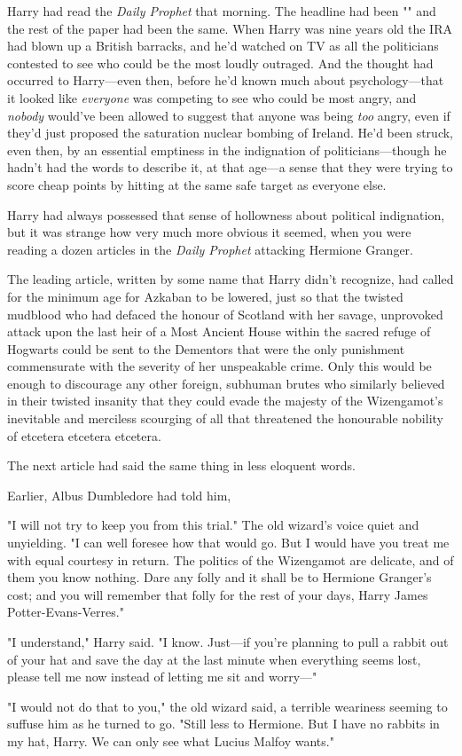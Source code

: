 Harry had read the \emph{Daily Prophet} that morning. The headline had been
"" and the rest of the paper had been
the same. When Harry was nine years old the IRA had blown up a British
barracks, and he’d watched on TV as all the politicians contested to see who
could be the most loudly outraged. And the thought had occurred to Harry—even
then, before he’d known much about psychology—that it looked like
\emph{everyone} was competing to see who could be most angry, and \emph{nobody}
would’ve been allowed to suggest that anyone was being \emph{too} angry, even
if they’d just proposed the saturation nuclear bombing of Ireland. He’d been
struck, even then, by an essential emptiness in the indignation of
politicians—though he hadn’t had the words to describe it, at that age—a
sense that they were trying to score cheap points by hitting at the same safe
target as everyone else.

Harry had always possessed that sense of hollowness about political
indignation, but it was strange how very much more obvious it seemed, when you
were reading a dozen articles in the \emph{Daily Prophet} attacking Hermione
Granger.

The leading article, written by some name that Harry didn’t recognize, had
called for the minimum age for Azkaban to be lowered, just so that the twisted
mudblood who had defaced the honour of Scotland with her savage, unprovoked
attack upon the last heir of a Most Ancient House within the sacred refuge of
Hogwarts could be sent to the Dementors that were the only punishment
commensurate with the severity of her unspeakable crime. Only this would be
enough to discourage any other foreign, subhuman brutes who similarly believed
in their twisted insanity that they could evade the majesty of the Wizengamot’s
inevitable and merciless scourging of all that threatened the honourable
nobility of etcetera etcetera etcetera.

The next article had said the same thing in less eloquent words.

Earlier, Albus Dumbledore had told him,

\begin{em}
"I will not try to keep you from this trial." The old wizard’s voice
quiet and unyielding. "I can well foresee how that would go. But I would have
you treat me with equal courtesy in return. The politics of the Wizengamot are
delicate, and of them you know nothing. Dare any folly and it shall be to
Hermione Granger’s cost; and you will remember that folly for the rest of your
days, Harry James Potter-Evans-Verres."

"I understand," Harry said. "I know. Just—if you’re planning to pull a
rabbit out of your hat and save the day at the last minute when everything
seems lost, please tell me now instead of letting me sit and worry—"

"I would not do that to you," the old wizard said, a terrible weariness
seeming to suffuse him as he turned to go. "Still less to Hermione. But I have
no rabbits in my hat, Harry. We can only see what Lucius Malfoy wants."
\end{em}

